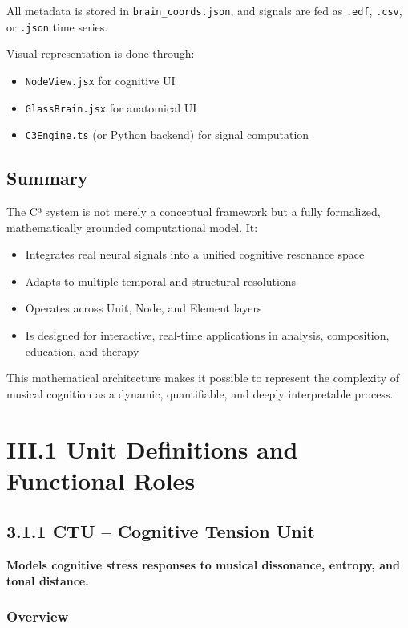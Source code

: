 All metadata is stored in \texttt{brain\_coords.json}, and signals are fed as \texttt{.edf}, \texttt{.csv}, or \texttt{.json} time series.

Visual representation is done through:

\begin{itemize}
    \item \texttt{NodeView.jsx} for cognitive UI
    \item \texttt{GlassBrain.jsx} for anatomical UI
    \item \texttt{C3Engine.ts} (or Python backend) for signal computation
\end{itemize}

\subsection*{Summary}

The C³ system is not merely a conceptual framework but a fully formalized, mathematically grounded computational model. It:

\begin{itemize}
    \item Integrates real neural signals into a unified cognitive resonance space
    \item Adapts to multiple temporal and structural resolutions
    \item Operates across Unit, Node, and Element layers
    \item Is designed for interactive, real-time applications in analysis, composition, education, and therapy
\end{itemize}

This mathematical architecture makes it possible to represent the complexity of musical cognition as a dynamic, quantifiable, and deeply interpretable process.

\section*{III.1 Unit Definitions and Functional Roles}

\subsection*{3.1.1 CTU – Cognitive Tension Unit}

\textbf{Models cognitive stress responses to musical dissonance, entropy, and tonal distance.}

\subsubsection*{Overview}

